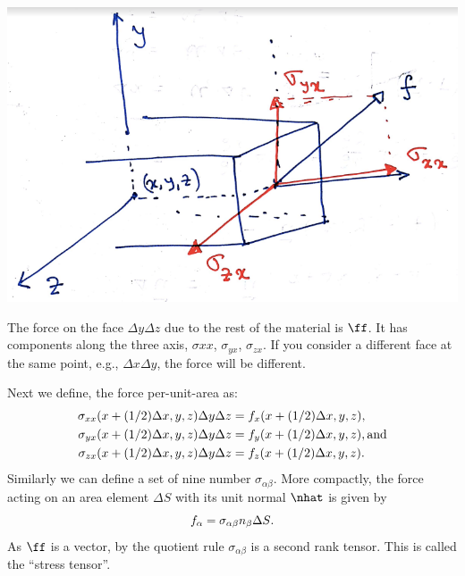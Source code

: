 \documentclass{tufte-book} %
\begin{document}
\begin{marginfigure}
  \includegraphics{figures/stress.png}
 \caption{ The force on the face $\Delta y\Delta z$ due to the rest of
 the material is $\ff$. It has components along the three axis,
 $\sigma{xx}$, $\sigma_{yx}$, $\sigma_{zx}$.  If you consider a 
different face at the same point, e.g., $\Delta x\Delta y$, 
the force will be different.}
  \label{fig:stress}
\end{marginfigure}
 Next we define, the force per-unit-area as:
\begin{subequations}
\begin{align} 
\sigma_{xx}(x+(1/2)\Delta x,y,z) \Delta y\Delta z&= f_x(x+(1/2)\Delta x,y,z)\/, \\
\sigma_{yx}(x+(1/2)\Delta x,y,z) \Delta y \Delta z&= f_y(x+(1/2)\Delta x,y,z)\/,
{\rm  and} \\ 
\sigma_{zx}(x+(1/2)\Delta x,y,z) \Delta y \Delta z  &= f_z(x+(1/2)\Delta x,y,z)\/. \end{align}
\end{subequations}
Similarly we can define a set of nine number $\sigma_{\alpha\beta}$.
More compactly, the force acting on an area element $\Delta S$ with
its unit normal $\nhat$ is given by 
\begin{equation}
f_{\alpha} = \sigma_{\alpha\beta}n_{\beta}\Delta S \/.
\end{equation}
As $\ff$ is a vector, by the quotient rule $\sigma_{\alpha\beta}$ is 
a second rank tensor.  This is called the ``stress tensor''.
\end{document}

